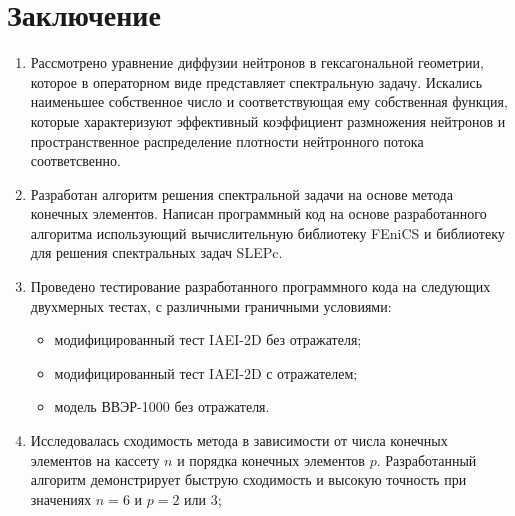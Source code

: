 \section{Заключение}
\label{s-5}
\begin{enumerate} \itemsep1pt \parskip0pt 
\item Рассмотрено уравнение диффузии нейтронов в гексагональной геометрии, которое в операторном виде представляет спектральную задачу. Искались наименьшее собственное число и соответствующая ему собственная функция, которые характеризуют эффективный коэффициент размножения нейтронов и пространственное распределение плотности нейтронного потока соответсвенно. \item Разработан алгоритм решения спектральной задачи на основе метода конечных элементов. Написан программный код на основе разработанного алгоритма использующий вычислительную библиотеку FEniCS и библиотеку для решения спектральных задач SLEPc. 
\item Проведено тестирование разработанного программного кода на следующих двухмерных тестах, с различными граничными условиями:
\begin{itemize} \itemsep1pt \parskip0pt 
\item модифицированный тест IAEI-2D без отражателя;
\item модифицированный тест IAEI-2D с отражателем;
\item модель ВВЭР-1000 без отражателя.
\end{itemize} 
\item Исследовалась сходимость метода в зависимости от числа конечных элементов на кассету $n$ и порядка конечных элементов $p$. Разработанный алгоритм демонстрирует быструю сходимость и высокую точность при значениях $n = 6$ и $p = 2$ или $3$;
\end{enumerate}
$\phantom{123}$
\\\\\\\\\\\\\\\\